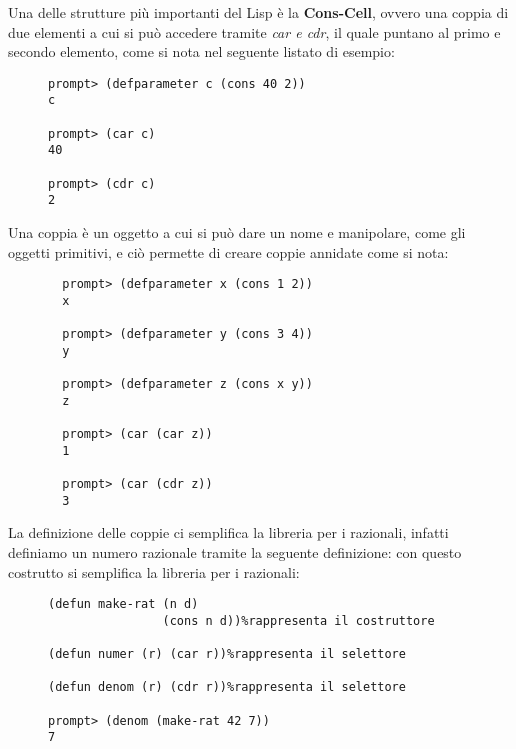 \documentclass[a4paper]{book}
\begin{document}
Una delle strutture più importanti del Lisp è la \textbf{Cons-Cell}, ovvero una coppia di due elementi a cui si può accedere tramite
\textit{car e cdr}, il quale puntano al primo e secondo elemento, come si nota nel seguente listato di esempio:
\begin{figure}
\begin{verbatim}
prompt> (defparameter c (cons 40 2))
c

prompt> (car c)
40

prompt> (cdr c)
2
\end{verbatim}
\end{figure}
Una coppia è un oggetto a cui si può dare un nome e manipolare, come gli oggetti primitivi, e ciò permette di creare coppie annidate come si nota:
\begin{figure}
\begin{verbatim}
  prompt> (defparameter x (cons 1 2))
  x

  prompt> (defparameter y (cons 3 4))
  y

  prompt> (defparameter z (cons x y))
  z

  prompt> (car (car z))
  1

  prompt> (car (cdr z))
  3
\end{verbatim}
\end{figure}
La definizione delle coppie ci semplifica la libreria per i razionali, infatti definiamo un numero razionale tramite la seguente definizione:
con questo costrutto si semplifica la libreria per i razionali:
\begin{figure}
\begin{verbatim}
(defun make-rat (n d)
                (cons n d))%rappresenta il costruttore

(defun numer (r) (car r))%rappresenta il selettore

(defun denom (r) (cdr r))%rappresenta il selettore

prompt> (denom (make-rat 42 7))
7
\end{verbatim}
\end{figure}
\end{document}
